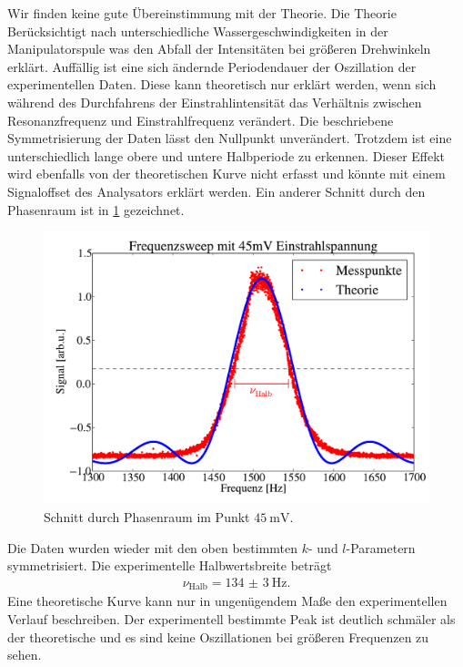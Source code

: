 \documentclass[paper=a4,
	fontsize=10pt,
	DIV=18,
	twocolumn,
	parskip=half
	]{scrartcl}
\numberwithin{equation}{section}    %
\begin{document}
Wir finden keine gute Übereinstimmung mit der Theorie.
Die Theorie Berücksichtigt nach \cite{anleitung} unterschiedliche Wassergeschwindigkeiten in der Manipulatorspule was den Abfall der Intensitäten bei größeren Drehwinkeln erklärt.
Auffällig ist eine sich ändernde Periodendauer der Oszillation der experimentellen Daten. 
Diese kann theoretisch nur erklärt werden, wenn sich während des Durchfahrens der Einstrahlintensität das Verhältnis zwischen Resonanzfrequenz und Einstrahlfrequenz verändert.
Die beschriebene Symmetrisierung der Daten lässt den Nullpunkt unverändert. 
Trotzdem ist eine unterschiedlich lange obere und untere Halbperiode zu erkennen.
Dieser Effekt wird ebenfalls von der theoretischen Kurve nicht erfasst und könnte mit einem Signaloffset des Analysators erklärt werden.
Ein anderer Schnitt durch den Phasenraum ist in \cref{halbwertsbreite} gezeichnet.
\begin{figure}[htp]
	\begin{center}
		\includegraphics[width=\columnwidth]{Data-Plots/13-Halbwertsfrequenz.pdf}
		\caption{Schnitt durch Phasenraum im Punkt $\SI{45}{\milli\volt}$.}
		\label{halbwertsbreite}
	\end{center}
\end{figure}
Die Daten wurden wieder mit den oben bestimmten $k$- und $l$-Parametern symmetrisiert.
Die experimentelle Halbwertsbreite beträgt
\begin{align}
	\nu_\mathrm{Halb}= \SI{134(3)}{\hertz}.
\end{align}
Eine theoretische Kurve kann nur in ungenügendem Maße den experimentellen Verlauf beschreiben.
Der experimentell bestimmte Peak ist deutlich schmäler als der theoretische und es sind keine Oszillationen bei größeren Frequenzen zu sehen.
\end{document}
